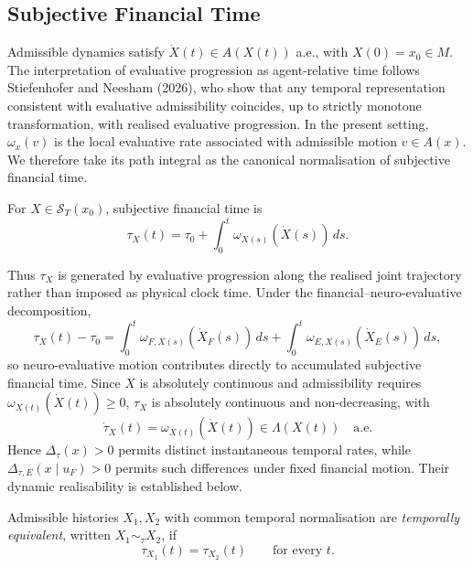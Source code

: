 \documentclass[graybox,natbib]{SNmult}
\providecommand{\1}{}
\renewcommand{\1}{\mathbbm 1}
\begin{document}
\subsection{Subjective Financial Time}
\label{subsec:subjective-financial-time}

Admissible dynamics satisfy
\(\dot X(t)\in A(X(t))\) a.e., with \(X(0)=x_0\in M\).
The interpretation of evaluative progression as agent-relative time follows
Stiefenhofer and Neesham (2026), who show that any temporal representation
consistent with evaluative admissibility coincides, up to strictly monotone
transformation, with realised evaluative progression. In the present setting,
\(\omega_x(v)\) is the local evaluative rate associated with admissible motion
\(v\in A(x)\). We therefore take its path integral as the canonical
normalisation of subjective financial time.

\begin{definition}
For \(X\in\mathcal S_T(x_0)\), subjective financial time is
\begin{equation}
\tau_X(t)
=
\tau_0+
\int_0^t
\omega_{X(s)}\!\left(\dot X(s)\right)\,ds.
\label{eq:time}
\end{equation}
\end{definition}

Thus \(\tau_X\) is generated by evaluative progression along the realised joint
trajectory rather than imposed as physical clock time. Under the
financial--neuro-evaluative decomposition,
\[
\tau_X(t)-\tau_0
=
\int_0^t\omega_{F,X(s)}(\dot X_F(s))\,ds
+
\int_0^t\omega_{E,X(s)}(\dot X_E(s))\,ds,
\]
so neuro-evaluative motion contributes directly to accumulated subjective
financial time. Since \(X\) is absolutely continuous and admissibility requires
\(\omega_{X(t)}(\dot X(t))\geq0\), \(\tau_X\) is absolutely continuous and
non-decreasing, with
\begin{equation}
\dot\tau_X(t)
=
\omega_{X(t)}(\dot X(t))
\in\Lambda(X(t))
\quad\text{a.e.}
\label{eq:time-rate}
\end{equation}
Hence \(\Delta_\tau(x)>0\) permits distinct instantaneous temporal rates, while
\(\Delta_{\tau,E}(x\mid u_F)>0\) permits such differences under fixed financial
motion. Their dynamic realisability is established below.

\begin{definition}
Admissible histories \(X_1,X_2\) with common temporal normalisation are
\emph{temporally equivalent}, written \(X_1\sim_\tau X_2\), if
\[
\tau_{X_1}(t)=\tau_{X_2}(t)
\qquad\text{for every }t.
\]
\end{definition}
\end{document}
